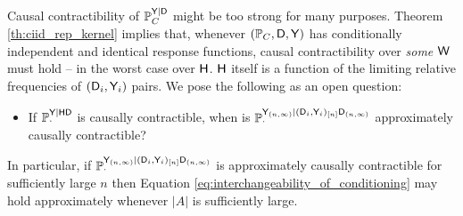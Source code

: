 Causal contractibility of $\mathbb{P}_C^{\mathsf{Y}|\mathsf{D}}$ might be too strong for many purposes. Theorem \ref{th:ciid_rep_kernel} implies that, whenever $(\mathbb{P}_C, \mathsf{D},\mathsf{Y})$ has conditionally independent and identical response functions, causal contractibility over \emph{some} $\mathsf{W}$ must hold -- in the worst case over $\mathsf{H}$. $\mathsf{H}$ itself is a function of the limiting relative frequencies of $(\mathsf{D}_i,\mathsf{Y}_i)$ pairs.  We pose the following as an open question:
\begin{itemize}
    \item If $\mathbb{P}_\cdot^{\mathsf{Y}|\mathsf{HD}}$ is causally contractible, when is $\mathbb{P}_\cdot^{\mathsf{Y}_{(n,\infty)}|(\mathsf{D}_i,\mathsf{Y}_i)_{[n]}\mathsf{D}_{(n,\infty)}}$ approximately causally contractible?
\end{itemize}
In particular, if $\mathbb{P}_\cdot^{\mathsf{Y}_{(n,\infty)}|(\mathsf{D}_i,\mathsf{Y}_i)_{[n]}\mathsf{D}_{(n,\infty)}}$ is approximately causally contractible for sufficiently large $n$ then Equation \ref{eq:interchangeability_of_conditioning} may hold approximately whenever $|A|$ is sufficiently large.






